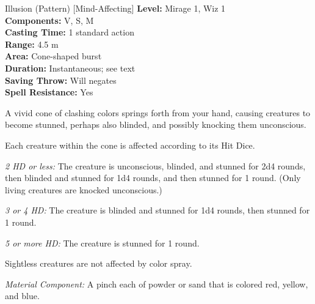{Illusion (Pattern) [Mind-Affecting]}
{
	\textbf{Level:}
	Mirage 1, Wiz 1\\
	\textbf{Components:}
	V, S, M\\
	\textbf{Casting Time:}
	1 standard action\\
	\textbf{Range:}
	4.5 m\\
	\textbf{Area:}
	Cone-shaped burst\\
	\textbf{Duration:}
	Instantaneous; see text\\
	\textbf{Saving Throw:}
	Will negates\\
	\textbf{Spell Resistance:}
	Yes\\
}
{
	A vivid cone of clashing colors springs forth from your hand, causing creatures to become stunned, perhaps also blinded, and possibly knocking them unconscious.

	Each creature within the cone is affected according to its Hit Dice.

	\textit{2 HD or less:}
	The creature is unconscious, blinded, and stunned for 2d4 rounds, then blinded and stunned for 1d4 rounds, and then stunned for 1 round. (Only living creatures are knocked unconscious.)

	\textit{3 or 4 HD:}
	The creature is blinded and stunned for 1d4 rounds, then stunned for 1 round.

	\textit{5 or more HD:}
	The creature is stunned for 1 round.

	Sightless creatures are not affected by color spray.

	\textit{Material Component:}
	A pinch each of powder or sand that is colored red, yellow, and blue.

}
